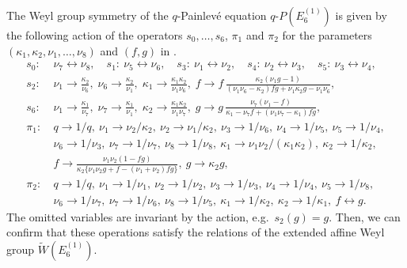 \documentclass[12pt]{amsart}
\numberwithin{equation}{section}
\theoremstyle{definition}
\begin{document}
The Weyl group symmetry of the $q$-Painlev\'e equation $q$-$P(E^{(1)}_6 )$ is given by the following action of the operators $s_0, \dots ,s_6$, $\pi _1$ and $\pi _2$ for the parameters $(\kappa_{1}, \kappa_{2}, \nu_{1}, \dots , \nu_{8}) $ and $(f, g) $ in \cite{KNY}.
\begin{align}
s_0 : & \: \nu_7 \leftrightarrow \nu_8 , \quad s_1 : \: \nu_5 \leftrightarrow \nu_6  , \quad s_3 : \: \nu_1 \leftrightarrow \nu_2 , \quad s_4 : \: \nu_2 \leftrightarrow \nu_3 , \quad s_5 : \: \nu_3 \leftrightarrow \nu_4 , \label{eq:AffineWeylActionE6} \\
 s_2 : & \: \nu_1 \rightarrow\frac{\kappa_2}{\nu_6}, \;
 \nu_6 \rightarrow \frac{\kappa_2}{\nu_1}, \;
 \kappa_1 \rightarrow \frac{\kappa_1\kappa_2}{\nu_1\nu_6}, \;
 f \rightarrow f\, \frac{\kappa_2 ( \nu_1 g-1)  }{ (\nu _1 \nu_6 - \kappa_2  )fg + \nu _1 \kappa_2 g - \nu _1 \nu_6 } ,\nonumber \\
 s_6 : & \: \nu_1 \rightarrow\frac{\kappa_1}{\nu_7}, \; 
 \nu_7 \rightarrow \frac{\kappa_1}{\nu_1}, \;
 \kappa_2 \rightarrow \frac{\kappa_1\kappa_2}{\nu_1\nu_7}, \;
  g \rightarrow g\, \frac{\nu _7 ( \nu_1 - f )  }{ \kappa_1  -  \nu _7 f + ( \nu _1 \nu_7 - \kappa_1 )fg } , \nonumber \\
  \pi _1 : & \: q \rightarrow 1/q, \: \nu_1 \rightarrow \nu_2 / \kappa_2 , \:  \nu_2 \rightarrow \nu_1 / \kappa_2 ,  \: \nu_3 \rightarrow 1/\nu_6,  \: \nu_4 \rightarrow 1/\nu_5, \: \nu_5 \rightarrow 1/\nu_4,  \nonumber \\
& \: \nu_6 \rightarrow 1/\nu_3, \: \nu_7 \rightarrow 1/\nu_7, \: \nu_8 \rightarrow 1/\nu_8, \: \kappa_1 \rightarrow \nu_1 \nu_2 /(\kappa_1 \kappa_2 ) , \: \kappa_2 \rightarrow 1/\kappa_2 ,\nonumber \\
& \: f \rightarrow \frac{\nu _1 \nu_2 ( 1- fg )}{ \kappa_2 \{ \nu _1 \nu_2 g + f- (\nu _1 + \nu _2 ) fg \} } , \: g \rightarrow \kappa_2 g , \nonumber \\
  \pi _2 : & \: q \rightarrow 1/q, \: \nu_1 \rightarrow 1/\nu_1, \:  \nu_2 \rightarrow 1/\nu_2,  \: \nu_3 \rightarrow 1/\nu_3,  \: \nu_4 \rightarrow 1/\nu_4, \: \nu_5 \rightarrow 1/\nu_8, \nonumber \\
& \: \nu_6 \rightarrow 1/\nu_7, \: \nu_7 \rightarrow 1/\nu_6, \: \nu_8 \rightarrow 1/\nu_5, \: \kappa_1 \rightarrow 1/\kappa_2 , \: \kappa_2 \rightarrow 1/\kappa_1 , \: f \leftrightarrow  g . \nonumber 
\end{align}
The omitted variables are invariant by the action, e.g.~$s_2 (g) =g$.
Then, we can confirm that these operations satisfy the relations of the extended affine Weyl group $\widetilde{W}(E^{(1)}_{6})$.
\end{document}
